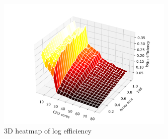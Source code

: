 \documentclass[twoside,12pt]{article}
\theoremstyle{definition}
\theoremstyle{remark}
\begin{document}
\begin{figure}[H]
    \centering
    \includegraphics[width=0.75\textwidth]{../analysis/logeff_heatmap_3d.pdf}
    \caption{3D heatmap of log efficiency}
    \label{fig:logeff-heat3d}
\end{figure}
\end{document}
